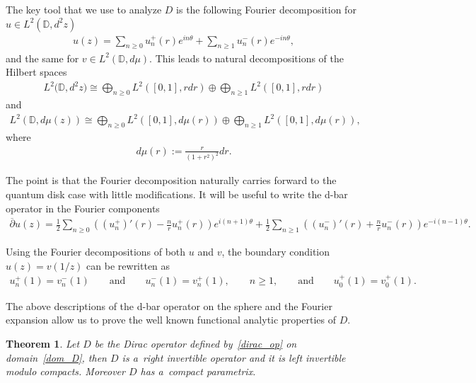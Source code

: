 \documentclass[pdftex]{sigma}
\numberwithin{equation}{section}
\newtheorem{theo}{Theorem}[section]
\begin{document}
The key tool that we use to analyze $D$ is the following Fourier decomposition for $u\in L^2({\mathbb D},d^2z)$
\begin{gather*}
u(z) = \sum\limits_{n\ge0} u_n^+(r) e^{in\theta} + \sum\limits_{n\ge1}u_n^-(r)e^{-in\theta},
\end{gather*}
and the same for $v\in L^2({\mathbb D},d\mu)$.
This leads to natural decompositions of the Hilbert spaces
\begin{gather*}
L^2\big({\mathbb D}, d^2z\big) \cong \bigoplus_{n\ge0} L^2\left([0,1],rdr\right)\oplus \bigoplus_{n\ge
1}L^2\left([0,1],rdr\right)
\end{gather*}
and
\begin{gather*}
L^2({\mathbb D},d\mu(z)) \cong \bigoplus_{n\ge0} L^2\left([0,1], d\mu(r)\right) \oplus \bigoplus_{n\ge1} L^2\left([0,1],d\mu(r)\right),
\end{gather*}
where
\begin{gather*}
d\mu(r):= \frac{r}{(1+r^2)^2}dr.
\end{gather*}

The point is that the Fourier decomposition naturally carries forward to the quantum disk case with little
modif\/ications.
It will be useful to write the d-bar operator in the Fourier components
\begin{gather}
\label{classDTO}
\overline{\partial}u(z) = \frac{1}{2}\sum\limits_{n\ge0}\!\left(\left(u_n^+\right)'(r) - \frac{n}{r}u_n^+(r)\right)e^{i(n+1)\theta}
+ \frac{1}{2}\sum\limits_{n\ge1}\!\left(\left(u_n^-\right)'(r) + \frac{n}{r}u_n^-(r)\right)e^{-i(n-1)\theta}.
\end{gather}

Using the Fourier decompositions of both $u$ and $v$, the boundary condition $u(z)=v(1/z)$ can be rewritten as
\begin{gather}
\label{bcft}
u_n^+(1) = v_n^-(1)
\qquad
\textrm{and}
\qquad
u_n^-(1) = v_n^+(1),
\qquad
n\ge 1,
\qquad
\textrm{and}
\qquad
u_0^+(1) = v_0^+(1).
\end{gather}

The above descriptions of the d-bar operator on the sphere and the Fourier expansion allow us to prove the well known
functional analytic properties of $D$.

\begin{theo}\label{compact_para_cont}
Let $D$ be the Dirac operator defined by~\eqref{dirac_op} on domain~\eqref{dom_D}, then $D$ is a~right invertible
operator and it is left invertible modulo compacts.
Moreover $D$ has a~compact parametrix.
\end{theo}
\end{document}
